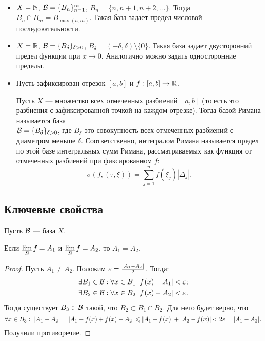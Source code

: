 \documentclass[a4paper, 12pt]{article}
\begin{document}
\begin{Examples}\ 
\begin{itemize}
\item $X = \mathbb{N}$, $\mathcal{B} = \{B_n\}_{n=1}^{\infty}$, $B_n = \{n, n+1, n+2, \ldots  \}$. Тогда $B_n \cap B_m = B_{\max(n, m)}$. Такая база задает предел числовой последовательности.
\item $X = \mathbb{R}$, $\mathcal{B} = \{B_\delta\}_{\delta>0}$, $B_\delta = (-\delta, \delta)\setminus \{0\}$. Такая база задает двусторонний предел функции при $x\to 0$. Аналогично можно задать односторонние пределы.
\item Пусть зафиксирован отрезок $[a, b]$ и $f:[a, b] \to \mathbb{R}$.

Пусть $X$ --- множество всех отмеченных разбиений $[a, b]$ (то есть это разбиения с зафиксированной точкой на каждом отрезке). Тогда базой Римана называется база\\ $\mathcal{B} = \{B_\delta\}_{\delta>0}$, где $B_\delta$ это совокупность всех отмеченных разбиений с диаметром меньше $\delta$. Соответственно, интегралом Римана называется предел по 
этой базе интегральных сумм Римана, рассматриваемых как функция от отмеченных разбиений при фиксированном $f$:
$$
\sigma(f, (\tau, \xi)) = \sum\limits_{j=1}^{n}f(\xi_j)|\Delta_j|.
$$
\end{itemize}
\end{Examples}

\subsection{Ключевые свойства}
Пусть $\mathcal{B}$ --- база $X$.

\begin{Statement}
Если $\lim\limits_{\mathcal{B}} f = A_1$ и $\lim\limits_{\mathcal{B}} f = A_2$, то $A_1 = A_2$.
\end{Statement}
\begin{proof}
Пусть $A_1 \neq A_2$. Положим $\varepsilon = \frac{|A_1 - A_2|}{2}$. Тогда:
\begin{align*}
& \exists B_1 \in \mathcal{B}: \forall x \in B_1\ |f(x) - A_1| < \varepsilon; \\
& \exists B_2 \in \mathcal{B}: \forall x \in B_2\ |f(x) - A_2| < \varepsilon.
\end{align*}
Тогда существует $B_3 \in \mathcal{B}$ такой, что $B_2 \subset B_1 \cap B_2$. Для него будет верно, что
$$
\forall x \in B_3:\ |A_1 - A_2| = |A_1 - f(x) + f(x) - A_2| \leqslant |A_1 - f(x)| + |A_2 - f(x)| < 2\varepsilon = |A_1 - A_2|.
$$
Получили противоречие.
\end{proof}
\end{document}
